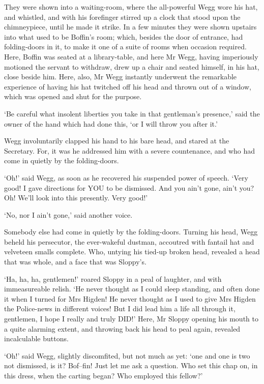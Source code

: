 They were shown into a waiting-room, where the all-powerful Wegg wore
his hat, and whistled, and with his forefinger stirred up a clock that
stood upon the chimneypiece, until he made it strike. In a few minutes
they were shown upstairs into what used to be Boffin’s room; which,
besides the door of entrance, had folding-doors in it, to make it one
of a suite of rooms when occasion required. Here, Boffin was seated at a
library-table, and here Mr Wegg, having imperiously motioned the servant
to withdraw, drew up a chair and seated himself, in his hat, close
beside him. Here, also, Mr Wegg instantly underwent the remarkable
experience of having his hat twitched off his head and thrown out of a
window, which was opened and shut for the purpose.

‘Be careful what insolent liberties you take in that gentleman’s
presence,’ said the owner of the hand which had done this, ‘or I will
throw you after it.’

Wegg involuntarily clapped his hand to his bare head, and stared at the
Secretary. For, it was he addressed him with a severe countenance, and
who had come in quietly by the folding-doors.

‘Oh!’ said Wegg, as soon as he recovered his suspended power of speech.
‘Very good! I gave directions for YOU to be dismissed. And you ain’t
gone, ain’t you? Oh! We’ll look into this presently. Very good!’

‘No, nor I ain’t gone,’ said another voice.

Somebody else had come in quietly by the folding-doors. Turning his
head, Wegg beheld his persecutor, the ever-wakeful dustman, accoutred
with fantail hat and velveteen smalls complete. Who, untying his
tied-up broken head, revealed a head that was whole, and a face that was
Sloppy’s.

‘Ha, ha, ha, gentlemen!’ roared Sloppy in a peal of laughter, and with
immeasureable relish. ‘He never thought as I could sleep standing, and
often done it when I turned for Mrs Higden! He never thought as I used
to give Mrs Higden the Police-news in different voices! But I did lead
him a life all through it, gentlemen, I hope I really and truly DID!’
Here, Mr Sloppy opening his mouth to a quite alarming extent, and
throwing back his head to peal again, revealed incalculable buttons.

‘Oh!’ said Wegg, slightly discomfited, but not much as yet: ‘one and one
is two not dismissed, is it? Bof--fin! Just let me ask a question. Who
set this chap on, in this dress, when the carting began? Who employed
this fellow?’

